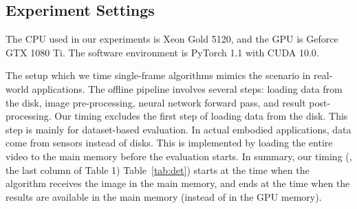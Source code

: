 \begin{table}[]
\small
\centering
\caption{Comparison of 2D video object detection datasets. For surveillance camera setups, the cameras are either stationary or have limited motion. For ego-vehicle setups, the scene dynamics evolve quickly, as (1) the ego-vehicle is traveling fast, and (2) other objects are much closer to the camera and thus have a higher speed in the image space. Our contributed dataset (annotation) is a high-frame-rate and high-resolution multi-class one compared to existing datasets
}
\label{tab:datasetcompare}
\addtolength{\tabcolsep}{0.2em}
\addtolength{\tabcolsep}{-0.2em} 
\end{table}

\subsection{Experiment Settings}
 The CPU used in our experiments is Xeon Gold 5120, and the GPU is Geforce GTX 1080 Ti. The software environment is PyTorch 1.1 with CUDA 10.0. 

 The setup which we time single-frame algorithms mimics the scenario in real-world applications. The offline pipeline involves several steps: loading data from the disk, image pre-processing, neural network forward pass, and result post-processing. Our timing excludes the first step of loading data from the disk. This step is mainly for dataset-based evaluation. In actual embodied applications, data come from sensors instead of disks. This is implemented by loading the entire video to the main memory before the evaluation starts. In summary, our timing (\eg, the last column of
\ifstandalonesupplement
    Table 1)
\else
    Table~\ref{tab:det})
\fi
 starts at the time when the algorithm receives the image in the main memory, and ends at the time when the results are available in the main memory (instead of in the GPU memory).
 
